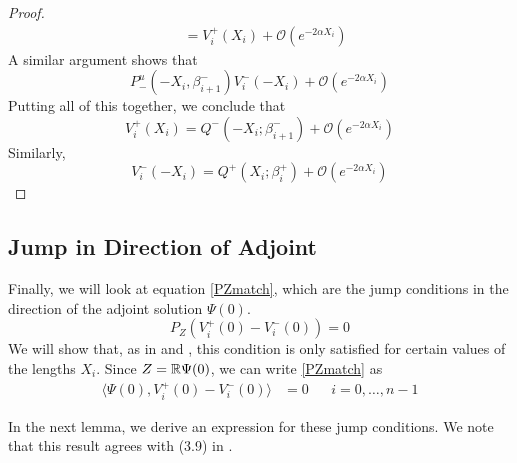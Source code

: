 \documentclass[thesis.tex]{subfiles}
\begin{document}
\begin{lemma}
\begin{proof}
\begin{align*}
&= V_i^+(X_i) + \mathcal{O}(e^{-2 \alpha X_i})
\end{align*}
A similar argument shows that
\[
P^u_-(-X_i, \beta_{i+1}^-) V_i^-(-X_i) + \mathcal{O}(e^{-2 \alpha X_i})
\]
Putting all of this together, we conclude that
\begin{equation*}
V_i^+(X_i) = Q^-(-X_i; \beta_{i+1}^-) + \mathcal{O}(e^{-2 \alpha X_i})
\end{equation*}
Similarly,
\begin{equation*}
V_i^-(-X_i) = Q^+(X_i; \beta_i^+) + \mathcal{O}(e^{-2 \alpha X_i})
\end{equation*}
\end{proof}
\end{lemma}

\subsection{Jump in Direction of Adjoint}

Finally, we will look at equation \eqref{PZmatch}, which are the jump conditions in the direction of the adjoint solution $\Psi(0)$. 
\[
P_Z(V_i^+(0) - V_i^-(0)) = 0
\]
We will show that, as in \cite{Sandstede1998} and \cite{SandstedeStrut}, this condition is only satisfied for certain values of the lengths $X_i$. Since $Z = {\mathbb R} \Psi(0)$, we can write \eqref{PZmatch} as
\begin{align}\label{PZmatch2}
\langle \Psi(0), V_i^+(0) - V_i^-(0) \rangle &= 0 && i = 0, \dots, n-1
\end{align}

In the next lemma, we derive an expression for these jump conditions. We note that this result agrees with (3.9) in \cite{SandstedeStrut}.

\end{document}
